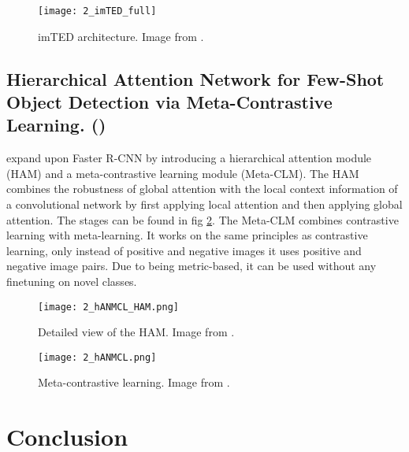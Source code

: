 \begin{figure}[h]
	\centering
	\texttt{[image: 2\_imTED\_full]}
	\caption{\label{fig:2_imTED_full} imTED architecture. Image from \citet{imTED}.}
\end{figure}

\subsection*{Hierarchical Attention Network for Few-Shot
Object Detection via Meta-Contrastive Learning. (\citet{hANMCL})}

\citet{hANMCL} expand upon Faster R-CNN \citep{fasterrcnn} by introducing a  hierarchical attention module (HAM) and a meta-contrastive learning module (Meta-CLM). The HAM combines the robustness of global attention with the local context information of a convolutional network by first applying local attention and then applying global attention. The stages can be found in fig \ref{fig:2_hANMCL_HAM}. The Meta-CLM combines contrastive learning with meta-learning. It works on the same principles as contrastive learning, only instead of positive and negative images it uses positive and negative image pairs. Due to being metric-based, it can be used without any finetuning on novel classes.

\begin{figure}[H]
	\centering
	\texttt{[image: 2\_hANMCL\_HAM.png]}
	\caption{\label{fig:2_hANMCL_HAM} Detailed view of the HAM. Image from \citet{hANMCL}.}
\end{figure}

\begin{figure}[H]
	\centering
	\texttt{[image: 2\_hANMCL.png]}
	\caption{\label{fig:2_hANMCL} Meta-contrastive learning. Image from \citet{hANMCL}.}
\end{figure}

\section{Conclusion}

